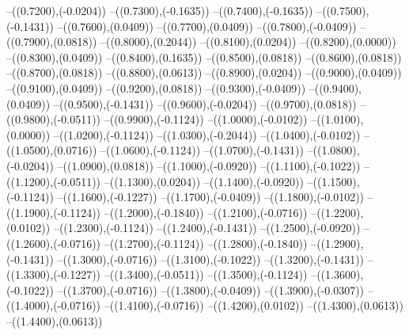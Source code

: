 {	--({\sx*(0.7200)},{\sy*(-0.0204)})
	--({\sx*(0.7300)},{\sy*(-0.1635)})
	--({\sx*(0.7400)},{\sy*(-0.1635)})
	--({\sx*(0.7500)},{\sy*(-0.1431)})
	--({\sx*(0.7600)},{\sy*(0.0409)})
	--({\sx*(0.7700)},{\sy*(0.0409)})
	--({\sx*(0.7800)},{\sy*(-0.0409)})
	--({\sx*(0.7900)},{\sy*(0.0818)})
	--({\sx*(0.8000)},{\sy*(0.2044)})
	--({\sx*(0.8100)},{\sy*(0.0204)})
	--({\sx*(0.8200)},{\sy*(0.0000)})
	--({\sx*(0.8300)},{\sy*(0.0409)})
	--({\sx*(0.8400)},{\sy*(0.1635)})
	--({\sx*(0.8500)},{\sy*(0.0818)})
	--({\sx*(0.8600)},{\sy*(0.0818)})
	--({\sx*(0.8700)},{\sy*(0.0818)})
	--({\sx*(0.8800)},{\sy*(0.0613)})
	--({\sx*(0.8900)},{\sy*(0.0204)})
	--({\sx*(0.9000)},{\sy*(0.0409)})
	--({\sx*(0.9100)},{\sy*(0.0409)})
	--({\sx*(0.9200)},{\sy*(0.0818)})
	--({\sx*(0.9300)},{\sy*(-0.0409)})
	--({\sx*(0.9400)},{\sy*(0.0409)})
	--({\sx*(0.9500)},{\sy*(-0.1431)})
	--({\sx*(0.9600)},{\sy*(-0.0204)})
	--({\sx*(0.9700)},{\sy*(0.0818)})
	--({\sx*(0.9800)},{\sy*(-0.0511)})
	--({\sx*(0.9900)},{\sy*(-0.1124)})
	--({\sx*(1.0000)},{\sy*(-0.0102)})
	--({\sx*(1.0100)},{\sy*(0.0000)})
	--({\sx*(1.0200)},{\sy*(-0.1124)})
	--({\sx*(1.0300)},{\sy*(-0.2044)})
	--({\sx*(1.0400)},{\sy*(-0.0102)})
	--({\sx*(1.0500)},{\sy*(0.0716)})
	--({\sx*(1.0600)},{\sy*(-0.1124)})
	--({\sx*(1.0700)},{\sy*(-0.1431)})
	--({\sx*(1.0800)},{\sy*(-0.0204)})
	--({\sx*(1.0900)},{\sy*(0.0818)})
	--({\sx*(1.1000)},{\sy*(-0.0920)})
	--({\sx*(1.1100)},{\sy*(-0.1022)})
	--({\sx*(1.1200)},{\sy*(-0.0511)})
	--({\sx*(1.1300)},{\sy*(0.0204)})
	--({\sx*(1.1400)},{\sy*(-0.0920)})
	--({\sx*(1.1500)},{\sy*(-0.1124)})
	--({\sx*(1.1600)},{\sy*(-0.1227)})
	--({\sx*(1.1700)},{\sy*(-0.0409)})
	--({\sx*(1.1800)},{\sy*(-0.0102)})
	--({\sx*(1.1900)},{\sy*(-0.1124)})
	--({\sx*(1.2000)},{\sy*(-0.1840)})
	--({\sx*(1.2100)},{\sy*(-0.0716)})
	--({\sx*(1.2200)},{\sy*(0.0102)})
	--({\sx*(1.2300)},{\sy*(-0.1124)})
	--({\sx*(1.2400)},{\sy*(-0.1431)})
	--({\sx*(1.2500)},{\sy*(-0.0920)})
	--({\sx*(1.2600)},{\sy*(-0.0716)})
	--({\sx*(1.2700)},{\sy*(-0.1124)})
	--({\sx*(1.2800)},{\sy*(-0.1840)})
	--({\sx*(1.2900)},{\sy*(-0.1431)})
	--({\sx*(1.3000)},{\sy*(-0.0716)})
	--({\sx*(1.3100)},{\sy*(-0.1022)})
	--({\sx*(1.3200)},{\sy*(-0.1431)})
	--({\sx*(1.3300)},{\sy*(-0.1227)})
	--({\sx*(1.3400)},{\sy*(-0.0511)})
	--({\sx*(1.3500)},{\sy*(-0.1124)})
	--({\sx*(1.3600)},{\sy*(-0.1022)})
	--({\sx*(1.3700)},{\sy*(-0.0716)})
	--({\sx*(1.3800)},{\sy*(-0.0409)})
	--({\sx*(1.3900)},{\sy*(-0.0307)})
	--({\sx*(1.4000)},{\sy*(-0.0716)})
	--({\sx*(1.4100)},{\sy*(-0.0716)})
	--({\sx*(1.4200)},{\sy*(0.0102)})
	--({\sx*(1.4300)},{\sy*(0.0613)})
	--({\sx*(1.4400)},{\sy*(0.0613)})
}
